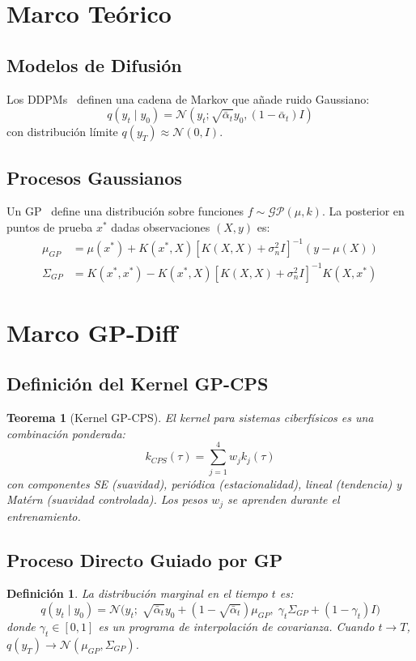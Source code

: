 \documentclass[conference]{IEEEtran}
\newtheorem{theorem}{Teorema}
\newtheorem{definition}{Definición}
\begin{document}
\section{Marco Teórico}
\subsection{Modelos de Difusión}
Los DDPMs~\cite{ho2020} definen una cadena de Markov que añade ruido Gaussiano:
\begin{equation}
q(y_t \mid y_0) = \mathcal{N}(y_t; \sqrt{\bar{\alpha}_t} y_0, (1 - \bar{\alpha}_t)I)
\end{equation}
con distribución límite $q(y_T) \approx \mathcal{N}(0, I)$.

\subsection{Procesos Gaussianos}
Un GP~\cite{rasmussen2006} define una distribución sobre funciones $f \sim \mathcal{GP}(\mu, k)$. La posterior en puntos de prueba $x^*$ dadas observaciones $(X, y)$ es:
\begin{align}
\mu_{GP} &= \mu(x^*) + K(x^*, X)[K(X,X) + \sigma_n^2 I]^{-1}(y - \mu(X))\\
\Sigma_{GP} &= K(x^*, x^*) - K(x^*, X)[K(X,X) + \sigma_n^2 I]^{-1}K(X, x^*)
\end{align}

\section{Marco GP-Diff}
\subsection{Definición del Kernel GP-CPS}
\begin{theorem}[Kernel GP-CPS]
El kernel para sistemas ciberfísicos es una combinación ponderada:
\begin{equation}
k_{CPS}(\tau) = \sum_{j=1}^4 w_j k_j(\tau)
\end{equation}
con componentes SE (suavidad), periódica (estacionalidad), lineal (tendencia) y Matérn (suavidad controlada). Los pesos $w_j$ se aprenden durante el entrenamiento.
\end{theorem}

\subsection{Proceso Directo Guiado por GP}
\begin{definition}
La distribución marginal en el tiempo $t$ es:
\begin{equation}
q(y_t \mid y_0) = \mathcal{N}\big(y_t;\; \sqrt{\bar{\alpha}_t} y_0 + (1 - \sqrt{\bar{\alpha}_t})\mu_{GP},\; \gamma_t \Sigma_{GP} + (1 - \gamma_t)I\big)
\end{equation}
donde $\gamma_t \in [0,1]$ es un programa de interpolación de covarianza. Cuando $t \to T$, $q(y_T) \to \mathcal{N}(\mu_{GP}, \Sigma_{GP})$.
\end{definition}
\end{document}
